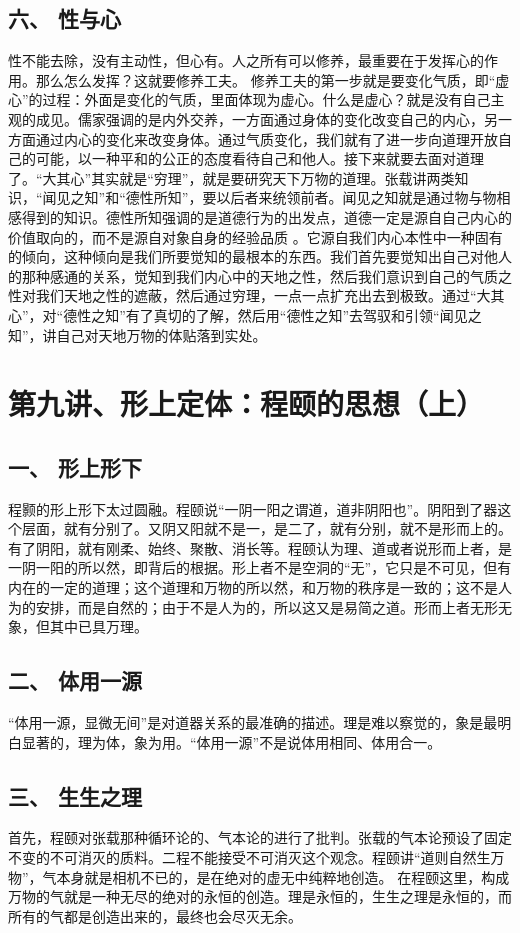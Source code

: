 \documentclass{article}
\begin{document}
\subsection{六、	性与心}
性不能去除，没有主动性，但心有。人之所有可以修养，最重要在于发挥心的作用。那么怎么发挥？这就要修养工夫。
修养工夫的第一步就是要变化气质，即“虚心”的过程：外面是变化的气质，里面体现为虚心。什么是虚心？就是没有自己主观的成见。儒家强调的是内外交养，一方面通过身体的变化改变自己的内心，另一方面通过内心的变化来改变身体。通过气质变化，我们就有了进一步向道理开放自己的可能，以一种平和的公正的态度看待自己和他人。接下来就要去面对道理了。“大其心”其实就是“穷理”，就是要研究天下万物的道理。张载讲两类知识，“闻见之知”和“德性所知”，要以后者来统领前者。闻见之知就是通过物与物相感得到的知识。德性所知强调的是道德行为的出发点，道德一定是源自自己内心的价值取向的，而不是源自对象自身的经验品质 。它源自我们内心本性中一种固有的倾向，这种倾向是我们所要觉知的最根本的东西。我们首先要觉知出自己对他人的那种感通的关系，觉知到我们内心中的天地之性，然后我们意识到自己的气质之性对我们天地之性的遮蔽，然后通过穷理，一点一点扩充出去到极致。通过“大其心”，对“德性之知”有了真切的了解，然后用“德性之知”去驾驭和引领“闻见之知”，讲自己对天地万物的体贴落到实处。

\section{第九讲、形上定体：程颐的思想（上）}
\subsection{一、	形上形下}
程颢的形上形下太过圆融。程颐说“一阴一阳之谓道，道非阴阳也”。阴阳到了器这个层面，就有分别了。又阴又阳就不是一，是二了，就有分别，就不是形而上的。有了阴阳，就有刚柔、始终、聚散、消长等。程颐认为理、道或者说形而上者，是一阴一阳的所以然，即背后的根据。形上者不是空洞的“无”，它只是不可见，但有内在的一定的道理；这个道理和万物的所以然，和万物的秩序是一致的；这不是人为的安排，而是自然的；由于不是人为的，所以这又是易简之道。形而上者无形无象，但其中已具万理。
\subsection{二、	体用一源}
“体用一源，显微无间”是对道器关系的最准确的描述。理是难以察觉的，象是最明白显著的，理为体，象为用。“体用一源”不是说体用相同、体用合一。
\subsection{三、	生生之理}
首先，程颐对张载那种循环论的、气本论的进行了批判。张载的气本论预设了固定不变的不可消灭的质料。二程不能接受不可消灭这个观念。程颐讲“道则自然生万物”，气本身就是相机不已的，是在绝对的虚无中纯粹地创造。
在程颐这里，构成万物的气就是一种无尽的绝对的永恒的创造。理是永恒的，生生之理是永恒的，而所有的气都是创造出来的，最终也会尽灭无余。
\end{document}
